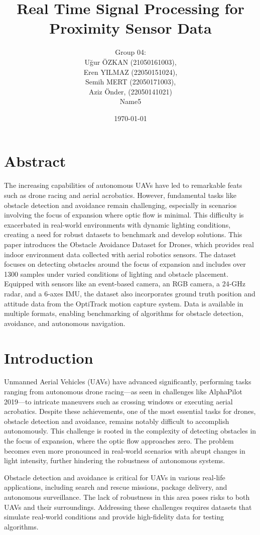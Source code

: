 \documentclass[12pt,a4paper]{article}
\title{Real Time Signal Processing for Proximity Sensor Data}
\author{
    Group 04: \\
    Uğur ÖZKAN (21050161003), \\
    Eren YILMAZ (22050151024), \\
    Semih MERT (22050171003), \\
    Aziz Önder, (22050141021)\\
    Name5
}
\date{\today}
\begin{document}
\maketitle
\section{Abstract}

The increasing capabilities of autonomous UAVs have led to remarkable feats such as drone racing and aerial acrobatics. However, fundamental tasks like obstacle detection and avoidance remain challenging, especially in scenarios involving the focus of expansion where optic flow is minimal. This difficulty is exacerbated in real-world environments with dynamic lighting conditions, creating a need for robust datasets to benchmark and develop solutions. This paper introduces the Obstacle Avoidance Dataset for Drones, which provides real indoor environment data collected with aerial robotics sensors. The dataset focuses on detecting obstacles around the focus of expansion and includes over 1300 samples under varied conditions of lighting and obstacle placement. Equipped with sensors like an event-based camera, an RGB camera, a 24-GHz radar, and a 6-axes IMU, the dataset also incorporates ground truth position and attitude data from the OptiTrack motion capture system. Data is available in multiple formats, enabling benchmarking of algorithms for obstacle detection, avoidance, and autonomous navigation.

\section{Introduction}

Unmanned Aerial Vehicles (UAVs) have advanced significantly, performing tasks ranging from autonomous drone racing—as seen in challenges like AlphaPilot 2019—to intricate maneuvers such as crossing windows or executing aerial acrobatics. Despite these achievements, one of the most essential tasks for drones, obstacle detection and avoidance, remains notably difficult to accomplish autonomously. This challenge is rooted in the complexity of detecting obstacles in the focus of expansion, where the optic flow approaches zero. The problem becomes even more pronounced in real-world scenarios with abrupt changes in light intensity, further hindering the robustness of autonomous systems.

Obstacle detection and avoidance is critical for UAVs in various real-life applications, including search and rescue missions, package delivery, and autonomous surveillance. The lack of robustness in this area poses risks to both UAVs and their surroundings. Addressing these challenges requires datasets that simulate real-world conditions and provide high-fidelity data for testing algorithms.
\end{document}
